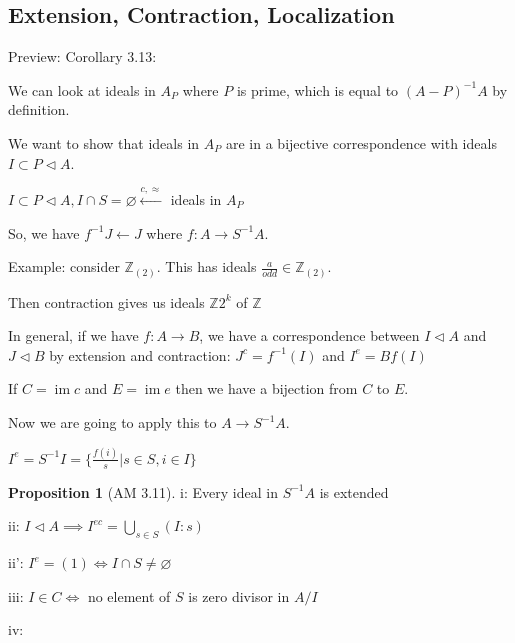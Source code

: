 \documentclass{article}
\theoremstyle{definition}
\newtheorem{proposition}{Proposition}
\newcommand{\im}{\operatorname{im}}
\begin{document}
\subsection*{Extension, Contraction, Localization}

Preview: Corollary 3.13:

We can look at ideals in \(A_P\) where \(P\) is prime, which is equal to \((A - P)^{-1} A\) by definition.

We want to show that ideals in \(A_P\) are in a bijective correspondence with ideals \(I \subset P \triangleleft A\).

\(I \subset P \triangleleft A, I\cap S = \varnothing \overset{c,\approx}{\longleftarrow} \) ideals in \(A_P\)  

So, we have \(f ^{-1} J \longleftarrow J\) where \(f: A \to S ^{-1} A\).

Example: consider \(\mathbb{Z}_{(2)}\). This has ideals \(\frac{a}{odd}\in\mathbb{Z}_{(2)}\).

Then contraction gives us ideals \(\mathbb{Z} 2^k\) of \(\mathbb{Z}\) 

In general, if we have \(f: A \to B\), we have a correspondence between \(I \triangleleft A\) and \(J \triangleleft B\) by extension and contraction: \(J^c = f ^{-1} (I)\) and \(I^e = Bf(I)\) 

If \(C = \im c\) and \(E = \im e\) then we have a bijection from \(C\) to \(E\).

Now we are going to apply this to \(A \to S ^{-1} A\).

\(I^e = S ^{-1} I = \{ \frac{f(i)}{s}|s\in S, i\in I \} \) 

\begin{proposition}
    [AM 3.11]

    i: Every ideal in \(S ^{-1} A\) is extended

    ii: \(I \triangleleft A \implies I^{ec} = \bigcup_{s\in S}^{} (I:s) \)  

    ii': \(I^e = (1) \iff I \cap S \neq \varnothing\) 

    iii:  \(I\in C \iff\) no element of \(S\) is zero divisor in \(A / I\)  

    iv:
\end{proposition}
\end{document}
